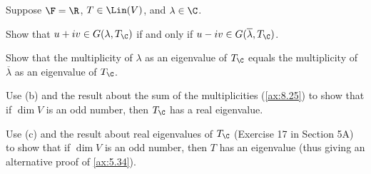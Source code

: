 \begin{exc}
\begin{exercise}
Suppose $\F=\R$, $T\in\Lin(V)$, and $\lambda\in\C$.
\begin{parts}
\item Show that $u+iv\in G(\lambda,T_{\C})$ if and only if
  $u-iv\in G(\overline{\lambda},T_{\C})$.
\item Show that the multiplicity of $\lambda$ as an eigenvalue of $T_{\C}$
  equals the multiplicity of $\overline{\lambda}$ as an eigenvalue of
  $T_{\C}$.
\item Use (b) and the result about the sum of the multiplicities
  (\ref{ax:8.25}) to show that if $\dim V$ is an odd number, then $T_{\C}$ has
  a real eigenvalue.
\item Use (c) and the result about real eigenvalues of $T_{\C}$ (Exercise 17 in
  Section 5A) to show that if $\dim V$ is an odd number, then $T$ has an
  eigenvalue (thus giving an alternative proof of \ref{ax:5.34}).
\end{parts}
\end{exercise}
\end{exc}
